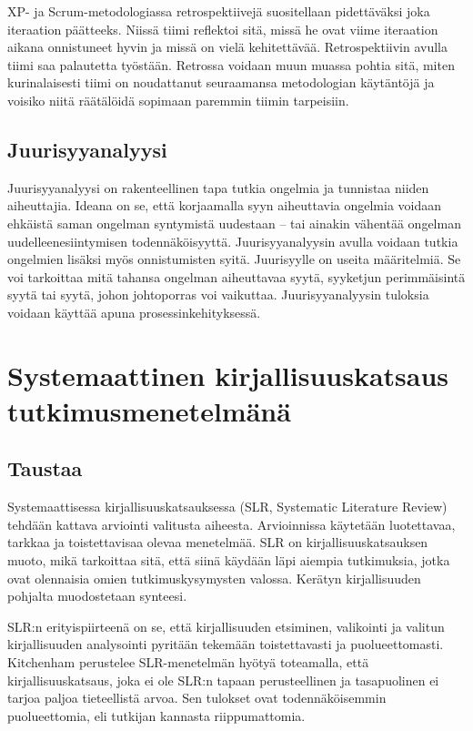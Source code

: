 XP- ja Scrum-metodologiassa retrospektiivejä suositellaan pidettäväksi joka iteraation päätteeks. Niissä tiimi reflektoi sitä, missä he ovat viime iteraation aikana onnistuneet hyvin ja missä on vielä kehitettävää. \citep{Lindstrom2004, ScrumGuide2011} Retrospektiivin avulla tiimi saa palautetta työstään. Retrossa voidaan muun muassa pohtia sitä, miten kurinalaisesti tiimi on noudattanut seuraamansa metodologian käytäntöjä ja voisiko niitä räätälöidä sopimaan paremmin tiimin tarpeisiin. \citep{Lindstrom2004}

\subsection{Juurisyyanalyysi}
Juurisyyanalyysi on rakenteellinen tapa tutkia ongelmia ja tunnistaa niiden aiheuttajia. Ideana on se, että korjaamalla syyn aiheuttavia ongelmia voidaan ehkäistä saman ongelman syntymistä uudestaan -- tai ainakin vähentää ongelman uudelleenesiintymisen todennäköisyyttä. \citep{Lehtinen2011} Juurisyyanalyysin avulla voidaan tutkia ongelmien lisäksi myös onnistumisten syitä. \citep{Bjornson2009} Juurisyylle on useita määritelmiä. Se voi tarkoittaa mitä tahansa ongelman aiheuttavaa syytä, syyketjun perimmäisintä syytä tai syytä, johon johtoporras voi vaikuttaa. Juurisyyanalyysin tuloksia voidaan käyttää apuna prosessinkehityksessä. \citep{Lehtinen2011}

\section{Systemaattinen kirjallisuuskatsaus tutkimusmenetelmänä}
\subsection{Taustaa}
Systemaattisessa kirjallisuuskatsauksessa (SLR, Systematic Literature Review) tehdään kattava arviointi valitusta aiheesta. Arvioinnissa käytetään luotettavaa, tarkkaa ja toistettavisaa olevaa menetelmää. SLR on kirjallisuuskatsauksen muoto, mikä tarkoittaa sitä, että siinä käydään läpi aiempia tutkimuksia, jotka ovat olennaisia omien tutkimuskysymysten valossa. Kerätyn kirjallisuuden pohjalta muodostetaan synteesi.\citep{Kitchenham2007}

SLR:n erityispiirteenä on se, että kirjallisuuden etsiminen, valikointi ja valitun kirjallisuuden analysointi pyritään tekemään toistettavasti ja puolueettomasti. Kitchenham perustelee SLR-menetelmän hyötyä toteamalla, että kirjallisuuskatsaus, joka ei ole SLR:n tapaan perusteellinen ja tasapuolinen ei tarjoa paljoa tieteellistä arvoa. Sen tulokset ovat todennäköisemmin puolueettomia, eli tutkijan kannasta riippumattomia. \citep{Kitchenham2007}

